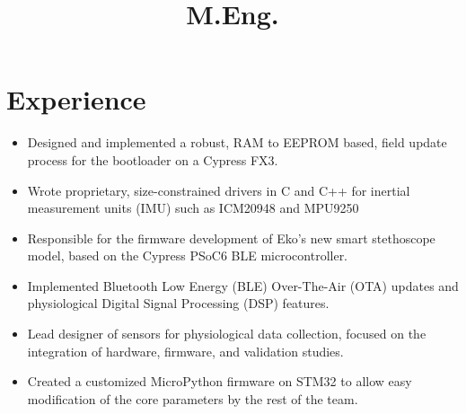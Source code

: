\documentclass[11pt,letterpaper,sans]{moderncv}       %
\title{M.Eng.}                       %
\begin{document}
\makecvtitle
\vspace*{-15mm}

\small{ }
        
     \section{Experience}
     
        \vspace{-1pt}
        {
        \vspace{-1pt}
        \begin{itemize}
            \item Designed and implemented a robust, RAM to EEPROM based, field update process for the bootloader on a Cypress FX3.
            \item Wrote proprietary, size-constrained drivers in C and C++ for inertial measurement units (IMU) such as ICM20948 and MPU9250
        \end{itemize}
        } 
        
        \vspace{-1pt}
        {
        \vspace{-1pt}
        \begin{itemize}
            \item Responsible for the firmware development of Eko's new smart stethoscope model, based on the Cypress PSoC6 BLE microcontroller.
            \item Implemented Bluetooth Low Energy (BLE) Over-The-Air (OTA) updates and physiological Digital Signal Processing (DSP) features.
        \end{itemize}
        } 
        
        \vspace{-1pt}
        {
        \vspace{-1pt}
        \begin{itemize}
            \item Lead designer of sensors for physiological data collection, focused on the integration of hardware, firmware, and validation studies.
            \item Created a customized MicroPython firmware on STM32 to allow easy modification of the core parameters by the rest of the team.
        \end{itemize}
        }
        
\end{document}

